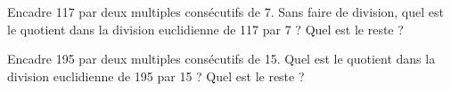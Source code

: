 \begin{myenumerate}
  \item Encadre 117 par deux multiples consécutifs de 7. Sans faire de division, quel est le quotient dans la division euclidienne de 117 par 7 ? Quel est le reste ?
  \item Encadre 195 par deux multiples consécutifs de 15. Quel est le quotient
dans la division euclidienne de 195 par 15 ? Quel est le reste ?
\end{myenumerate}